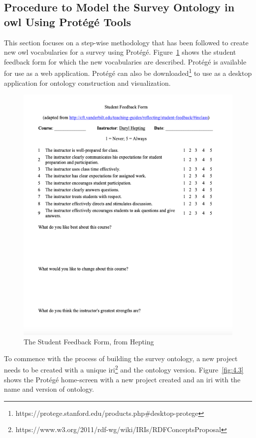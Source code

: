 \begin{doublespace}
\section{Procedure to Model the Survey Ontology in \ac{owl} Using Protégé Tools}
\par This section focuses on a step-wise methodology that has been followed to create new \ac{owl} vocabularies for a survey using Protégé. Figure~\ref{fig:4.2} shows the student feedback form for which the new vocabularies are described. Protégé is available for use as a web application. Protégé can also be downloaded\footnote{https://protege.stanford.edu/products.php\#desktop-protege} to use as a desktop application for ontology construction and visualization.
\begin{figure}[htp]
    \centering
    \includegraphics[width=15cm]{images/ch4/Figure2.png}
    \caption{The Student Feedback Form, from Hepting~\cite{prof}}
    \label{fig:4.2}
\end{figure}
\par To commence with the process of building the survey ontology, a new project needs to be created with a unique \ac{iri}\footnote{https://www.w3.org/2011/rdf-wg/wiki/IRIs/RDFConceptsProposal}  and the ontology version. Figure~\ref{fig:4.3} shows the Protégé home-screen with a new project created and an \ac{iri} with the name and version of ontology.

\end{doublespace}
